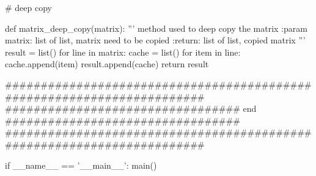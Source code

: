 \documentclass[14pt]{extarticle}
\begin{document}
\begin{python}
# deep copy

def matrix_deep_copy(matrix):
    '''
    method used to deep copy the matrix
    :param matrix: list of list, matrix need to be copied
    :return: list of list, copied matrix
    '''
    result = list()
    for line in matrix:
        cache = list()
        for item in line:
            cache.append(item)
        result.append(cache)    
    return result       


#######################################################################
################################# end #################################
#######################################################################
   
if __name__ == '__main__':
    main()
\end{python}

\newpage

\end{document}
